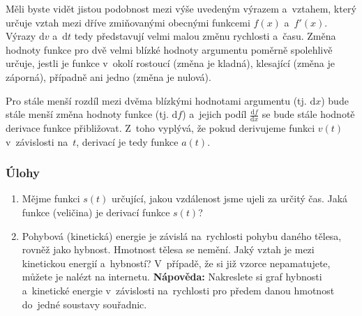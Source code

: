 Měli byste vidět jistou podobnost mezi výše uvedeným výrazem a~vztahem, který určuje vztah mezi dříve zmiňovanými obecnými funkcemi $f(x)$ a~$f'(x)$. Výrazy $\text{d}v$ a~$\text{d}t$ tedy představují velmi malou změnu rychlosti a~času. Změna hodnoty funkce pro dvě velmi blízké hodnoty argumentu poměrně spolehlivě určuje, jestli je funkce v~okolí rostoucí (změna je kladná), klesající (změna je záporná), případně ani jedno (změna je nulová).

Pro stále menší rozdíl mezi dvěma blízkými hodnotami argumentu (tj. $\text{d}x$) bude stále menší změna hodnoty funkce (tj. $\text{d}f$) a~jejich podíl $\frac{\text{d}f}{\text{d}x}$ se bude stále hodnotě derivace funkce přibližovat. Z~toho vyplývá, že pokud derivujeme funkci $v(t)$ v~závislosti na~$t$, derivací je tedy funkce $a(t)$.

\subsubsection*{Úlohy}
\begin{enumerate}
    \item Mějme funkci $s(t)$ určující, jakou vzdálenost jsme ujeli za určitý čas. Jaká funkce (veličina) je derivací funkce $s(t)$?
    
    \item Pohybová (kinetická) energie je závislá na~rychlosti pohybu daného tělesa, rovněž jako hybnost. Hmotnost tělesa se nemění. Jaký vztah je mezi kinetickou energií a~hybností? V~případě, že si již vzorce nepamatujete, můžete je nalézt na internetu. \textbf{Nápověda:} Nakreslete si graf hybnosti a~kinetické energie v~závislosti na~rychlosti pro předem danou hmotnost do~jedné soustavy souřadnic.
\end{enumerate}
